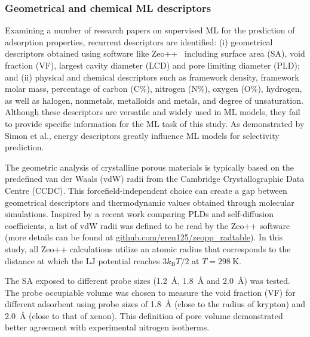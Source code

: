 \documentclass[main]{subfiles}
\begin{document}
\subsubsection{Geometrical and chemical ML descriptors}

Examining a number of research papers on supervised ML for the prediction of adsorption properties,\autocite{Fernandez_2013,Simon_2015,Fanourgakis_2020,Anderson_2020,Pardakhti_2020} recurrent descriptors are identified: (i) geometrical descriptors obtained using software like Zeo++~\autocite{zeopp_Willems2012} including surface area (SA), void fraction (VF), largest cavity diameter (LCD) and pore limiting diameter (PLD); and (ii) physical and chemical descriptors such as framework density, framework molar mass, percentage of carbon (C\%), nitrogen (N\%), oxygen (O\%), hydrogen, as well as halogen, nonmetals, metalloids and metals, and degree of unsaturation. Although these descriptors are versatile and widely used in ML models, they fail to provide specific information for the ML task of this study. As demonstrated by Simon et al., energy descriptors greatly influence ML models for selectivity prediction.

The geometric analysis of crystalline porous materials is typically based on the predefined van der Waals (vdW) radii from the Cambridge Crystallographic Data Centre (CCDC). This forcefield-independent choice can create a gap between geometrical descriptors and thermodynamic values obtained through molecular simulations. Inspired by a recent work comparing PLDs and self-diffusion coefficients,\autocite{Hung_2021} a list of vdW radii was defined to be read by the Zeo++ software (more details can be found at \url{github.com/eren125/zeopp_radtable}). In this study, all Zeo++ calculations utilize an atomic radius that corresponds to the distance at which the LJ potential reaches $3 k_\text{B} T/2$ at $T = \SI{298}{\kelvin}$.

The SA exposed to different probe sizes (\SI{1.2}{\angstrom}, \SI{1.8}{\angstrom} and \SI{2.0}{\angstrom}) was tested. The probe occupiable volume was chosen to measure the void fraction (VF) for different adsorbent using probe sizes of \SI{1.8}{\angstrom} (close to the radius of krypton) and \SI{2.0}{\angstrom} (close to that of xenon). This definition of pore volume demonstrated better agreement with experimental nitrogen isotherms.\autocite{vol_Ongari2017}
\end{document}
